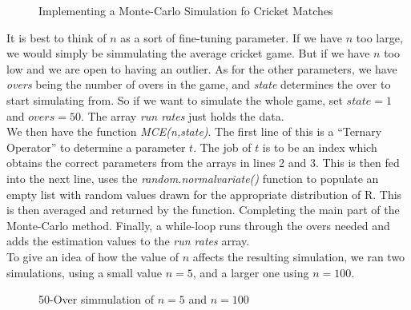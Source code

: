 \begin{figure}[h] %
    
    \caption{Implementing a Monte-Carlo Simulation fo Cricket Matches}
    \label{mcecode}
\end{figure}

It is best to think of $n$ as a sort of fine-tuning parameter. If we have $n$ too large, we would simply be simmulating the average cricket game. But if we have $n$ too low and 
we are open to having an outlier. As for the other parameters, we have \textit{overs} being the number of overs in the game, and \textit{state} determines the over to start 
simulating from. So if we want to simulate the whole game, set $state=1$ and $overs=50$. The array \textit{run rates} just holds the data.\\

We then have the function \textit{MCE(n,state)}. The first line of this is a ``Ternary Operator'' to determine a parameter $t$. The job of $t$ is to be an index which obtains 
the correct parameters from the arrays in lines 2 and 3. This is then fed into the next line, uses the \textit{random.normalvariate()} function to populate an empty list with random 
values drawn for the appropriate distribution of R. This is then averaged and returned by the function. Completing the main part of the Monte-Carlo method.
Finally, a while-loop runs through the overs needed and adds the estimation values to the \textit{run rates} array. \\

To give an idea of how the value of $n$ affects the resulting simulation, we ran two simulations, using a small value $n=5$, and a larger one using $n=100$. 

\begin{figure}[h]
    \centering
    \qquad
    \caption{50-Over simmulation of $n=5$ and $n=100$}
    \label{MeanAndSDRR}
\end{figure}

